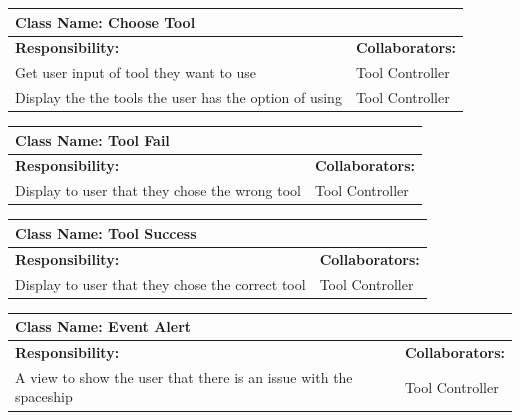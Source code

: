 \documentclass[12pt, titlepage]{article}
\begin{document}
\begin{enumerate}[a)]
	\begin{table}[H]
		\centering
		\begin{tabular}{|p{10cm}|p{5cm}|}
		\hline 
		 \multicolumn{2}{|l|}{\textbf{Class Name: Choose Tool}} \\
		\hline
		\textbf{Responsibility:} & \textbf{Collaborators:} \\
		\hline
		 Get user input of tool they want to use & Tool Controller\\
		\hline
		 Display the the tools the user has the option of using & Tool Controller \\
		\hline
		\end{tabular}
	\end{table}
	
	\begin{table}[H]
		\centering
		\begin{tabular}{|p{10cm}|p{5cm}|}
		\hline 
		 \multicolumn{2}{|l|}{\textbf{Class Name: Tool Fail}} \\
		\hline
		\textbf{Responsibility:} & \textbf{Collaborators:} \\
		\hline
		 Display to user that they chose the wrong tool & Tool Controller\\
		\hline
		\end{tabular}
	\end{table}

	\begin{table}[H]
		\centering
		\begin{tabular}{|p{10cm}|p{5cm}|}
		\hline 
		 \multicolumn{2}{|l|}{\textbf{Class Name: Tool Success}} \\
		\hline
		\textbf{Responsibility:} & \textbf{Collaborators:} \\
		\hline
		 Display to user that they chose the correct tool & Tool Controller\\
		\hline
		\end{tabular}
	\end{table}

	\begin{table}[H]
		\centering
		\begin{tabular}{|p{10cm}|p{5cm}|}
		\hline 
		 \multicolumn{2}{|l|}{\textbf{Class Name: Event Alert}} \\
		\hline
		\textbf{Responsibility:} & \textbf{Collaborators:} \\
		\hline
		 A view to show the user that there is an issue with the spaceship & Tool Controller\\
		\hline
		\end{tabular}
	\end{table}


\end{enumerate}
\end{document}
